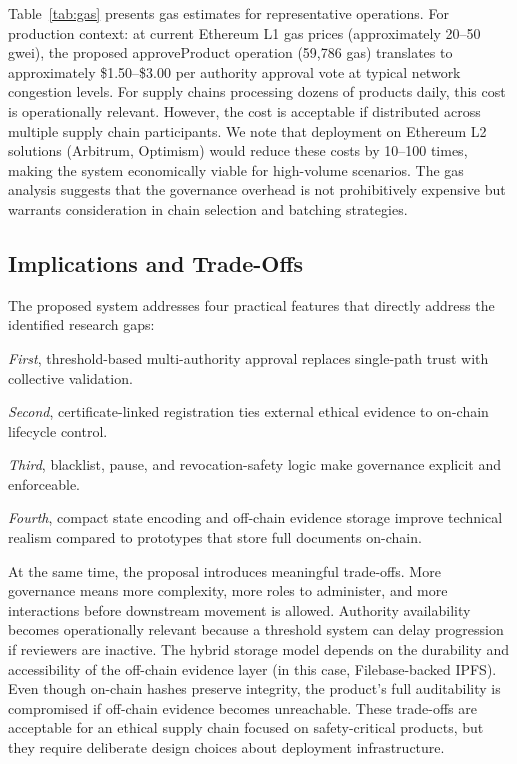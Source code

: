\documentclass[conference]{IEEEtran}
\begin{document}
Table~\ref{tab:gas} presents gas estimates for representative operations. For production context: at current Ethereum L1 gas prices (approximately 20–50 gwei), the proposed approveProduct operation (59,786 gas) translates to approximately \$1.50–\$3.00 per authority approval vote at typical network congestion levels. For supply chains processing dozens of products daily, this cost is operationally relevant. However, the cost is acceptable if distributed across multiple supply chain participants. We note that deployment on Ethereum L2 solutions (Arbitrum, Optimism) would reduce these costs by 10–100 times, making the system economically viable for high-volume scenarios. The gas analysis suggests that the governance overhead is not prohibitively expensive but warrants consideration in chain selection and batching strategies.

\subsection{Implications and Trade-Offs}

The proposed system addresses four practical features that directly address the identified research gaps:

\textit{First}, threshold-based multi-authority approval replaces single-path trust with collective validation.

\textit{Second}, certificate-linked registration ties external ethical evidence to on-chain lifecycle control.

\textit{Third}, blacklist, pause, and revocation-safety logic make governance explicit and enforceable.

\textit{Fourth}, compact state encoding and off-chain evidence storage improve technical realism compared to prototypes that store full documents on-chain.

At the same time, the proposal introduces meaningful trade-offs. More governance means more complexity, more roles to administer, and more interactions before downstream movement is allowed. Authority availability becomes operationally relevant because a threshold system can delay progression if reviewers are inactive. The hybrid storage model depends on the durability and accessibility of the off-chain evidence layer (in this case, Filebase-backed IPFS). Even though on-chain hashes preserve integrity, the product's full auditability is compromised if off-chain evidence becomes unreachable. These trade-offs are acceptable for an ethical supply chain focused on safety-critical products, but they require deliberate design choices about deployment infrastructure.
\end{document}

